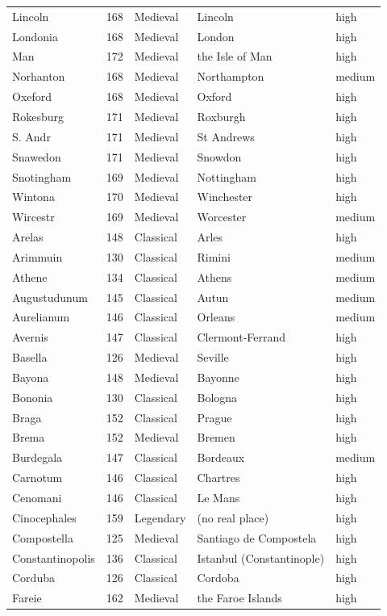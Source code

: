 \documentclass[11pt,a4paper]{article}
\begin{document}
{\begin{longtable}{p{3.2cm}rlp{6.6cm}l}
Lincoln & 168 & Medieval & Lincoln & high\\
Londonia & 168 & Medieval & London & high\\
Man & 172 & Medieval & the Isle of Man & high\\
Norhanton & 168 & Medieval & Northampton & medium\\
Oxeford & 168 & Medieval & Oxford & high\\
Rokesburg & 171 & Medieval & Roxburgh & high\\
S. Andr & 171 & Medieval & St Andrews & high\\
Snawedon & 171 & Medieval & Snowdon & high\\
Snotingham & 169 & Medieval & Nottingham & high\\
Wintona & 170 & Medieval & Winchester & high\\
Wircestr & 169 & Medieval & Worcester & medium\\
Arelas & 148 & Classical & Arles & high\\
Arimmuin & 130 & Classical & Rimini & medium\\
Athene & 134 & Classical & Athens & medium\\
Augustudunum & 145 & Classical & Autun & medium\\
Aurelianum & 146 & Classical & Orleans & medium\\
Avernis & 147 & Classical & Clermont-Ferrand & high\\
Basella & 126 & Medieval & Seville & high\\
Bayona & 148 & Medieval & Bayonne & high\\
Bononia & 130 & Classical & Bologna & high\\
Braga & 152 & Classical & Prague & high\\
Brema & 152 & Medieval & Bremen & high\\
Burdegala & 147 & Classical & Bordeaux & medium\\
Carnotum & 146 & Classical & Chartres & high\\
Cenomani & 146 & Classical & Le Mans & high\\
Cinocephales & 159 & Legendary & (no real place) & high\\
Compostella & 125 & Medieval & Santiago de Compostela & high\\
Constantinopolis & 136 & Classical & Istanbul (Constantinople) & high\\
Corduba & 126 & Classical & Cordoba & high\\
Fareie & 162 & Medieval & the Faroe Islands & high\\

\end{longtable}}
\end{document}
